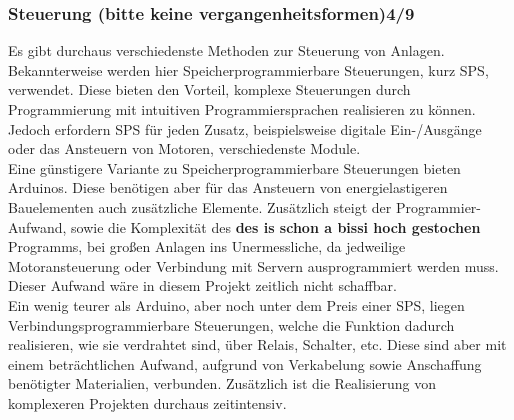 \subsubsection{Steuerung (bitte keine vergangenheitsformen)4/9}
Es gibt durchaus verschiedenste Methoden zur Steuerung von Anlagen. Bekannterweise werden hier Speicherprogrammierbare Steuerungen, kurz SPS, verwendet. Diese bieten den Vorteil, komplexe Steuerungen durch Programmierung mit intuitiven Programmiersprachen realisieren zu können. Jedoch erfordern SPS für jeden Zusatz, beispielsweise digitale Ein-/Ausgänge oder das Ansteuern von Motoren, verschiedenste Module. \\
Eine günstigere Variante zu Speicherprogrammierbare Steuerungen bieten Arduinos. Diese benötigen aber für das Ansteuern von energielastigeren Bauelementen auch zusätzliche Elemente. Zusätzlich steigt der Programmier-Aufwand, sowie die Komplexität des \textbf{des is schon a bissi hoch gestochen} Programms, bei großen Anlagen ins Unermessliche, da jedweilige Motoransteuerung oder Verbindung mit Servern ausprogrammiert werden muss. Dieser Aufwand wäre in diesem Projekt zeitlich nicht schaffbar.\\
Ein wenig teurer als Arduino, aber noch unter dem Preis einer SPS, liegen Verbindungsprogrammierbare Steuerungen, welche die Funktion dadurch realisieren, wie sie verdrahtet sind, über Relais, Schalter, etc. Diese sind aber mit einem beträchtlichen Aufwand, aufgrund von Verkabelung sowie Anschaffung benötigter Materialien, verbunden. Zusätzlich ist die Realisierung von komplexeren Projekten durchaus zeitintensiv. 



